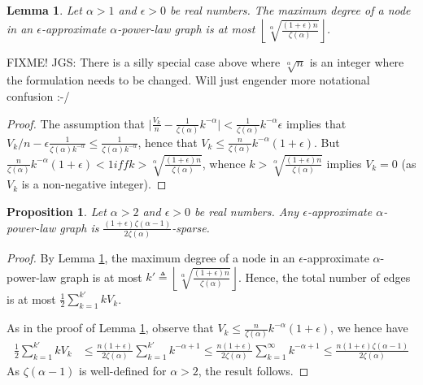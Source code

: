 \documentclass{article}
\newtheorem{proposition}{Proposition}
\newtheorem{lemma}{Lemma}
\theoremstyle{remark}
\begin{document}
  
 \begin{lemma}\label{lem:approximate_fewlarge}
 Let $\alpha > 1$ and $\epsilon > 0$ be real numbers. 
 The maximum degree of a node in an $\epsilon$-approximate $\alpha$-power-law graph is at most
$\left\lfloor \sqrt[\alpha]{\frac{(1+\epsilon)n}{\zeta(\alpha)}} \right\rfloor$. 
 \end{lemma}
 
 FIXME! JGS: There is a silly special case above where $\sqrt[\alpha]{n}$ is an integer where the formulation needs
 to be changed. Will just engender more notational confusion :-/
 
 \begin{proof}
The assumption that  $\vert \frac{V_k}{n} - \frac{1}{\zeta(\alpha)} k^{-\alpha} \vert < \frac{1}{\zeta(\alpha)} k^{-\alpha}\epsilon$ implies that $V_k/n - \epsilon\frac{1}{\zeta(\alpha)k^{-\alpha}} \leq \frac{1}{\zeta(\alpha)k^{-\alpha}}$, hence that
$V_k \leq \frac{n}{\zeta(\alpha)}k^{-\alpha} (1 + \epsilon)$. But
$\frac{n}{\zeta(\alpha)}k^{-\alpha} (1 + \epsilon) < 1 if{f} k > \sqrt[\alpha]{\frac{(1+\epsilon)n}{\zeta(\alpha)}}$,
whence $k > \sqrt[\alpha]{\frac{(1+\epsilon)n}{\zeta(\alpha)}}$ implies $V_k = 0$ (as $V_k$ is a non-negative integer).
 \end{proof}
 

 
 \begin{proposition}
 Let $\alpha > 2$ and $\epsilon > 0$ be real numbers. Any $\epsilon$-approximate $\alpha$-power-law graph
 is $\frac{(1+\epsilon)\zeta(\alpha-1)}{2\zeta(\alpha)}$-sparse. 
 \end{proposition}
 
 \begin{proof}
By Lemma \ref{lem:approximate_fewlarge}, the maximum degree of a node in an $\epsilon$-approximate $\alpha$-power-law graph is at most $k' \triangleq \left\lfloor \sqrt[\alpha]{\frac{(1+\epsilon)n}{\zeta(\alpha)}} \right\rfloor$. Hence, the total
 number of edges is at most $\frac{1}{2}\sum_{k=1}^{k'} k V_k$.
 
 As in the proof of Lemma \ref{lem:approximate_fewlarge}, observe that $V_k \leq \frac{n}{\zeta(\alpha)}k^{-\alpha} (1 + \epsilon)$, we hence have
 \begin{align*}
 \frac{1}{2}\sum_{k=1}^{k'} k V_k &\leq \frac{n(1+\epsilon)}{2\zeta(\alpha)} \sum_{k=1}^{k'} k^{-\alpha+1} 
 \leq  \frac{n(1+\epsilon)}{2\zeta(\alpha)} \sum_{k=1}^{\infty} k^{-\alpha+1}  
\leq \frac{n(1+\epsilon)\zeta(\alpha-1)}{2\zeta(\alpha)} 
 \end{align*}
 As $\zeta(\alpha - 1)$ is well-defined for $\alpha > 2$, the result follows.
 \end{proof}
 
\end{document}
